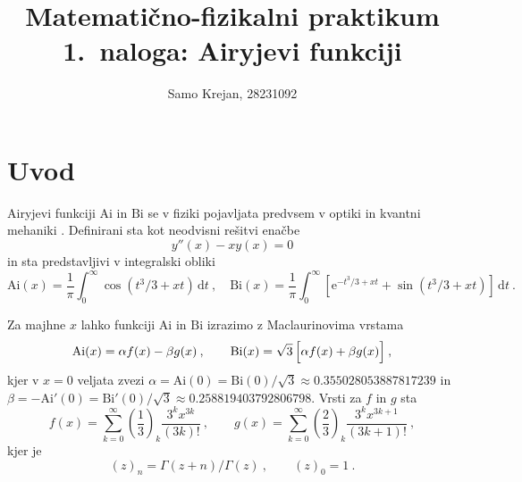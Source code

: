 \documentclass[slovene,11pt,a4paper]{article}
\title{
\sc\large Matematično-fizikalni praktikum \thisyear\\
\bigskip
\bf\Large 1.~naloga: Airyjevi funkciji
}
\author{Samo Krejan, 28231092}
\date{}
\newcommand{\dd}{\,\mathrm{d}}
\newcommand{\Ai}{\mathrm{Ai}}
\newcommand{\Bi}{\mathrm{Bi}}
\begin{document}
\maketitle
\vspace{-1cm}

\section{Uvod}
\label{uvod}

Airyjevi funkciji $\Ai$ in $\Bi$ %
se v fiziki pojavljata predvsem v optiki in kvantni mehaniki
\cite{Airy_use}.  Definirani sta kot neodvisni rešitvi enačbe
%
\begin{equation*}
  y''(x) -xy(x) = 0
\end{equation*}
%
in sta predstavljivi v integralski obliki
%
\begin{equation*}
  \Ai(x) = \frac{1}{\pi} \int_0^\infty \cos (t^3/3 + x t) \dd t \>,\quad
  \Bi(x) = \frac{1}{\pi} \int_0^\infty \left[ \mathrm{e}^{-t^3/3 + x t}
  + \sin (t^3/3 + x t) \right] \dd t \>.
\end{equation*}
%


Za majhne $x$ lahko funkciji $\Ai$ in $\Bi$ izrazimo
z Maclaurinovima vrstama
%
\begin{equation*}
  \Ai(x) = \alpha f(x) - \beta g(x)\>,\qquad
  \Bi(x) = \sqrt{3}\, \Bigl[\alpha f (x) + \beta g(x) \Bigr]\>,
\end{equation*}
kjer v $x=0$ veljata zvezi
%
$\alpha = \Ai(0) = \Bi(0)/\sqrt{3}\approx 0.355028053887817239$ in
$\beta = -\Ai'(0) = \Bi'(0)/\sqrt{3}\approx 0.258819403792806798$.
Vrsti za $f$ in $g$ sta
\begin{equation*}
  f(x) = \sum_{k=0}^\infty
  \left(\frac{1}{3}\right)_k \frac{3^k x^{3k}}{(3k)!} \>, \qquad
  g(x) = \sum_{k=0}^\infty
  \left(\frac{2}{3}\right)_k \frac{3^k x^{3k+1}}{(3k+1)!} \>,
\end{equation*}
kjer je
\begin{equation*}
  (z)_n = \Gamma(z+n)/\Gamma(z) \>, \qquad (z)_0 = 1 \>.
\end{equation*}
\end{document}
